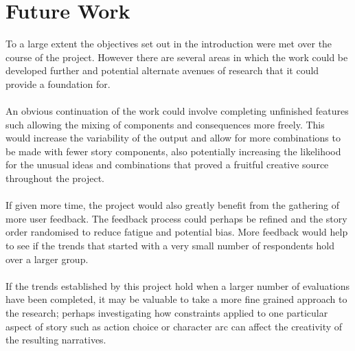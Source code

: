 \documentclass[letterpaper]{article}
\begin{document}
\section{Future Work}
To a large extent the objectives set out in the introduction were met over the course of the project. However there are several areas in which the work could be developed further and potential alternate avenues of research that it could provide a foundation for.\\
\\An obvious continuation of the work could involve completing unfinished features such allowing the mixing of components and consequences more freely. This would increase the variability of the output and allow for more combinations to be made with fewer story components, also potentially increasing the likelihood for the unusual ideas and combinations that proved a fruitful creative source throughout the project.\\
\\If given more time, the project would also greatly benefit from the gathering of more user feedback. The feedback process could perhaps be refined and the story order randomised to reduce fatigue and potential bias. More feedback would help to see if the trends that started with a very small number of respondents hold over a larger group.\\
\\If the trends established by this project hold when a larger number of evaluations have been completed, it may be valuable to take a more fine grained approach to the research; perhaps investigating how constraints applied to one particular aspect of story such as action choice or character arc can affect the creativity of the resulting narratives.\\

\end{document}
